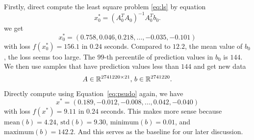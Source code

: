 Firstly, direct compute the least square problem \eqref{eq:ls}
by equation
\begin{equation} \label{eq:psudo}
    x_0^*=(A_0^TA_0)^{-1}A_0^Tb_0.
\end{equation}
we get
$$
    x_0^*=(0.758, 0.046, 0.218, \dots, -0.035, -0.101)
$$
with loss $f(x_0^*) = 156.1$ in $0.24$ seconds.
Compared to $12.2$, the mean value of $b_0$,
the loss seems too large.
The $99$-th percentile of prediction values in $b_0$ is $144$.
We then use samples that have prediction values less than $144$
and get new data
\begin{equation}
    A \in {\mathbb{R}}^{2741220\times 21}, \,
    b\in{\mathbb{R}}^{2741220}.
\end{equation}
Directly compute using Equation~\eqref{eq:psudo} again, we have
$$
    x^*=(0.189, -0.012, -0.008, \dots, 0.042, -0.040)
$$
with loss $f(x^*) = 9.11$ in $0.24$ seconds.
This makes more sense because
$\text{mean}(b)=4.24$,
$\text{std}(b) = 9.30$,
$\text{minimum}(b) = 0.01$, and
$\text{maximum}(b) = 142.2$.
And this serves as the baseline for our later discussion.
